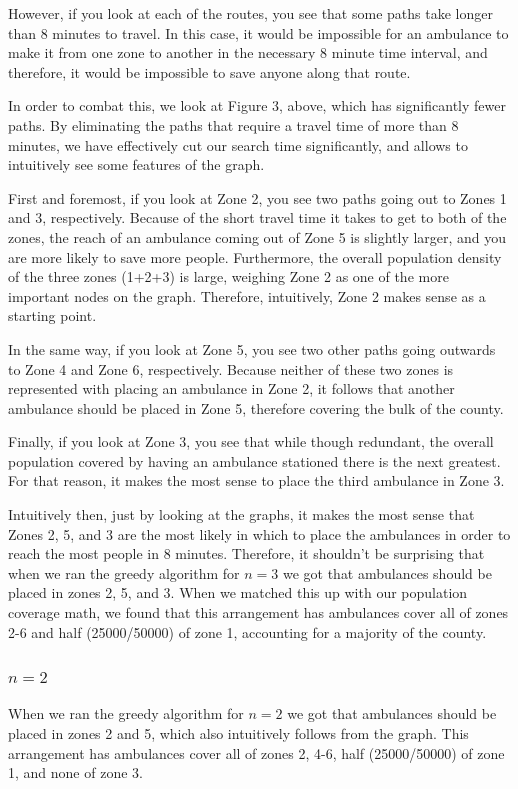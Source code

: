 \documentclass[notitlepage, 12pt]{article}
\begin{document}
However, if you look at each of the routes, you see that some paths take longer than 8 minutes to travel. In this case, it would be impossible for an ambulance to make it from one zone to another in the necessary 8 minute time interval, and therefore, it would be impossible to save anyone along that route. 

In order to combat this, we look at Figure 3, above, which has significantly fewer paths. By eliminating the paths that require a travel time of more than 8 minutes, we have effectively cut our search time significantly, and allows to intuitively see some features of the graph. 

First and foremost, if you look at Zone 2, you see two paths going out to Zones 1 and 3, respectively. Because of the short travel time it takes to get to both of the zones, the reach of an ambulance coming out of Zone 5 is slightly larger, and you are more likely to save more people. Furthermore, the overall population density of the three zones (1+2+3) is large, weighing Zone 2 as one of the more important nodes on the graph. Therefore, intuitively, Zone 2 makes sense as a starting point.

In the same way, if you look at Zone 5, you see two other paths going outwards to Zone 4 and Zone 6, respectively. Because neither of these two zones is represented with placing an ambulance in Zone 2, it follows that another ambulance should be placed in Zone 5, therefore covering the bulk of the county.

Finally, if you look at Zone 3, you see that while though redundant, the overall population covered by having an ambulance stationed there is the next greatest. For that reason, it makes the most sense to place the third ambulance in Zone 3.

Intuitively then, just by looking at the graphs, it makes the most sense that Zones 2, 5, and 3 are the most likely in which to place the ambulances in order to reach the most people in 8 minutes. Therefore, it shouldn't be surprising that when we ran the greedy algorithm for $n=3$ we got that ambulances should be placed in zones
2, 5, and 3. When we matched this up with our population coverage math, we found that this arrangement has ambulances cover all of zones 2-6 and half (25000/50000) of zone 1, accounting for a majority of the county.

\subsubsection{$n=2$}
When we ran the greedy algorithm for $n=2$ we got that ambulances should be placed in zones
2 and 5, which also intuitively follows from the graph. This arrangement has ambulances cover all of zones 2, 4-6, half      (25000/50000) of zone 1, and none of zone 3.
\end{document}
